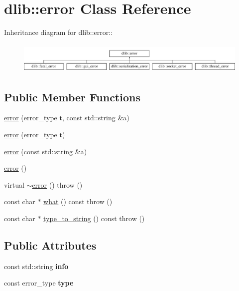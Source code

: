 \hypertarget{classdlib_1_1error}{
\section{dlib::error Class Reference}
\label{classdlib_1_1error}
}
Inheritance diagram for dlib::error::\begin{figure}[H]
\begin{center}
\leavevmode
\includegraphics[height=1.50336cm]{classdlib_1_1error}
\end{center}
\end{figure}
\subsection*{Public Member Functions}
\begin{DoxyCompactItemize}
\item 
\hyperlink{classdlib_1_1error_a9bf6adbf16ad50c6a509b4e18d6becaa}{error} (error\_\-type t, const std::string \&a)
\item 
\hyperlink{classdlib_1_1error_aef92e7c614783f7a1290b8430dc3bea8}{error} (error\_\-type t)
\item 
\hyperlink{classdlib_1_1error_a05e6b9e17d00751f4603b9b19774fcc0}{error} (const std::string \&a)
\item 
\hyperlink{classdlib_1_1error_a7aa811457dae46c97d8b9ecc696b0559}{error} ()
\item 
virtual \hyperlink{classdlib_1_1error_ab9a83be4747253f0450091206efa901f}{$\sim$error} ()  throw ()
\item 
const char $\ast$ \hyperlink{classdlib_1_1error_a5f469c24dbcb32b0f83f66ded3609e92}{what} () const   throw ()
\item 
const char $\ast$ \hyperlink{classdlib_1_1error_aa45c616e14dd55887ad8b6f8b7b2e9aa}{type\_\-to\_\-string} () const   throw ()
\end{DoxyCompactItemize}
\subsection*{Public Attributes}
\begin{DoxyCompactItemize}
\item 
\hypertarget{classdlib_1_1error_a1c79d2462200ab506098b4c921ee6776}{
const std::string {\bfseries info}}
\label{classdlib_1_1error_a1c79d2462200ab506098b4c921ee6776}

\item 
\hypertarget{classdlib_1_1error_ab7e9eb19d8033a682d096a31192de73f}{
const error\_\-type {\bfseries type}}
\label{classdlib_1_1error_ab7e9eb19d8033a682d096a31192de73f}

\end{DoxyCompactItemize}


